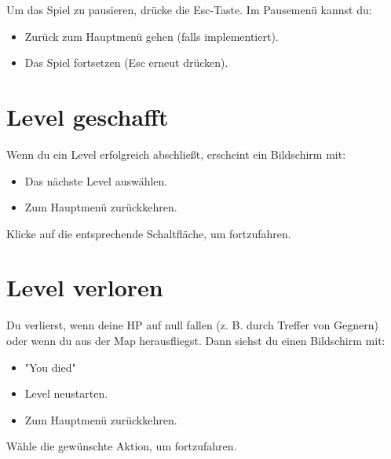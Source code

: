 \documentclass[a4paper,12pt]{article}
\begin{document}
Um das Spiel zu pausieren, drücke die Esc-Taste. Im Pausemenü kannst du:
\begin{itemize}
    \item Zurück zum Hauptmenü gehen (falls implementiert).
    \item Das Spiel fortsetzen (Esc erneut drücken).
\end{itemize}

\newpage

\section{Level geschafft}
\label{sec:levelgeschafft}

Wenn du ein Level erfolgreich abschließt, erscheint ein Bildschirm mit:
\begin{itemize}
    \item Das nächste Level auswählen.
    \item Zum Hauptmenü zurückkehren.
\end{itemize}

Klicke auf die entsprechende Schaltfläche, um fortzufahren.

\newpage

\section{Level verloren}
\label{sec:levelfehler}

Du verlierst, wenn deine HP auf null fallen (z. B. durch Treffer von Gegnern) oder wenn du aus der Map herausfliegst. Dann siehst du einen Bildschirm mit:
\begin{itemize}
    \item "You died"
    \item Level neustarten.
    \item Zum Hauptmenü zurückkehren.
\end{itemize}

Wähle die gewünschte Aktion, um fortzufahren.
\end{document}
